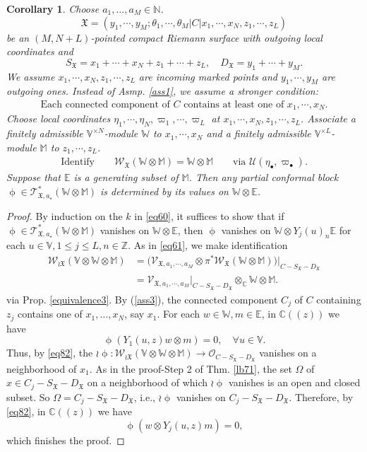 \documentclass[11pt,b5paper,notitlepage]{article}
\theoremstyle{definition}
\theoremstyle{plain}
\newtheorem{co}[df]{Corollary}
\newcommand{\fk}{\mathfrak}
\newcommand{\mc}{\mathcal}
\newcommand{\SV}{\mathscr{V}}
\newcommand{\scr}{\mathscr}
\newcommand{\SX}{{S_{\fk X}}}
\newcommand{\DX}{D_{\fk X}}
\newcommand{\blt}{\bullet}
\newcommand{\Vbb}{\mathbb V}
\newcommand{\Wbb}{\mathbb W}
\newcommand{\Mbb}{\mathbb M}
\newcommand{\Cbb}{\mathbb C}
\newcommand{\Nbb}{\mathbb N}
\newcommand{\Zbb}{\mathbb Z}
\newcommand{\Ebb}{\mathbb E}
\newcommand{\<}{\left\langle}
\renewcommand{\>}{\right\rangle}
\newcommand{\MU}{\mathcal{U}}
\newcommand{\fx}{\mathfrak{X}}
\newcommand{\SW}{\mathscr{W}}
\numberwithin{equation}{section}
\begin{document}
\begin{co}\label{propagation3}
Choose $a_1,\dots,a_M\in\Nbb$.
$$
\fx=(y_1,\cdots,y_M;\theta_1,\cdots,\theta_M\big|C\big| x_1,\cdots,x_N,z_1,\cdots,z_L)
$$
be an $(M,N+L)$-pointed compact Riemann surface with outgoing local coordinates and 
$$
S_\fx=x_1+\cdots+x_N+z_1+\cdots+z_L,\quad D_\fx=y_1+\cdots+y_M.
$$
We assume $x_1,\cdots,x_N,z_1,\cdots,z_L$ are incoming marked points and $y_1,\cdots,y_M$ are outgoing ones. Instead of Asmp. \ref{ass1}, we assume a stronger condition:
\begin{align}\label{ass3}
\text{Each connected component of $C$ contains at least one of $x_1,\cdots,x_N$.}
\end{align}
Choose local coordinates $\eta_1,\cdots,\eta_N,\varpi_1,\cdots,\varpi_L$ at $x_1,\cdots,x_N,z_1,\cdots,z_L$. Associate a finitely admissible $\Vbb^{\times N}$-module $\Wbb$ to $x_1,\cdots,x_N$ and a finitely admissible $\Vbb^{\times L}$-module $\Mbb$ to $z_1,\cdots,z_L$. 
\begin{align*}
\text{Identify}\qquad\SW_\fx(\Wbb\otimes \Mbb)=\Wbb\otimes \Mbb\qquad \text{via }\MU(\eta_\blt,\varpi_\blt).
\end{align*}
Suppose that $\Ebb$ is a generating subset of $\Mbb$. Then any partial conformal block $\upphi\in\scr T_{\fk X,a_\star}^*(\Wbb\otimes\Mbb)$ is determined by its values on $\Wbb\otimes \Ebb$.
\end{co}


\begin{proof}
By induction on the $k$ in \eqref{eq60}, it suffices to show that    if $\upphi\in\scr T_{\fk X,a_\star}^*(\Wbb\otimes\Mbb)$ vanishes on $\Wbb\otimes \Ebb$, then $\upphi$ vanishes on $\Wbb\otimes Y_j(u)_n \Ebb$ for each $u\in \Vbb, 1\leq j\leq L,n\in \Zbb$.  As in \eqref{eq61}, we make identification
$$
\begin{aligned}
 \SW_{\wr\fx}(\Vbb\otimes \Wbb\otimes \Mbb)&=\big(\SV_{\fx,a_1,\cdots,a_M}\otimes \pi^*\SW_\fx(\Wbb\otimes \Mbb)\big)\vert_{C-S_\fx-D_\fx}\\
 &=\SV_{\fx,a_1,\cdots,a_M}\vert_{C-S_\fx-D_\fx}\otimes_\Cbb \Wbb\otimes \Mbb.
 \end{aligned}
$$
via Prop. \ref{equivalence3}. By (\ref{ass3}),  the connected component $C_j$ of $C$ containing $z_j$ contains one of $x_1,\dots,x_N$, say $x_1$. For each $w\in \Wbb,m\in \Ebb$, in $\Cbb((z))$ we have
$$
\upphi(Y_1(u,z)w\otimes m)=0,\quad \forall u\in \Vbb.
$$
Thus, by \eqref{eq82}, the $\wr\upphi:\scr W_{\wr\fk X}(\Vbb\otimes\Wbb\otimes\Mbb)\rightarrow\mc O_{C-\SX-\DX}$ vanishes on a neighborhood of $x_1$. As in the proof-Step 2 of Thm. \ref{lb71}, the set $\Omega$ of $x\in C_j-\SX-\DX$ on a neighborhood of which $\wr\upphi$ vanishes is an open and closed subset. So $\Omega=C_j-\SX-\DX$, i.e., $\wr\upphi$ vanishes on $C_j-\SX-\DX$. Therefore, by \eqref{eq82}, in $\Cbb((z))$ we have
$$
\upphi(w\otimes Y_j(u,z)m)=0,
$$
which finishes the proof.
\end{proof}
\end{document}
